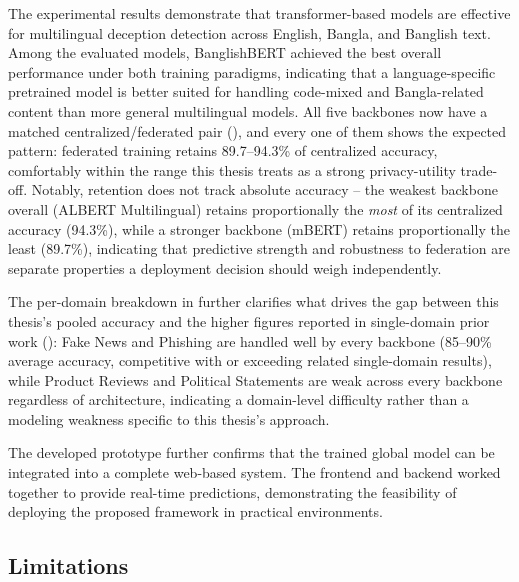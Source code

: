 The experimental results demonstrate that transformer-based models are effective
for multilingual deception detection across English, Bangla, and Banglish text.
Among the evaluated models, BanglishBERT achieved the best overall performance
under both training paradigms, indicating that a language-specific pretrained
model is better suited for handling code-mixed and Bangla-related content than
more general multilingual models. All five backbones now have a matched
centralized/federated pair (), and every one of them shows
the expected pattern: federated training retains 89.7--94.3\% of centralized
accuracy, comfortably within the range this thesis treats as a strong
privacy-utility trade-off. Notably, retention does not track absolute accuracy
-- the weakest backbone overall (ALBERT Multilingual) retains proportionally the
\emph{most} of its centralized accuracy (94.3\%), while a stronger backbone
(mBERT) retains proportionally the least (89.7\%), indicating that predictive
strength and robustness to federation are separate properties a deployment
decision should weigh independently.

The per-domain breakdown in  further clarifies what
drives the gap between this thesis's pooled accuracy and the higher figures
reported in single-domain prior work (): Fake
News and Phishing are handled well by every backbone (85--90\% average accuracy,
competitive with or exceeding related single-domain results), while Product
Reviews and Political Statements are weak across every backbone regardless of
architecture, indicating a domain-level difficulty rather than a modeling
weakness specific to this thesis's approach.

The developed prototype further confirms that the trained global model can be
integrated into a complete web-based system. The frontend and backend worked
together to provide real-time predictions, demonstrating the feasibility of
deploying the proposed framework in practical environments.

\subsection{Limitations}

